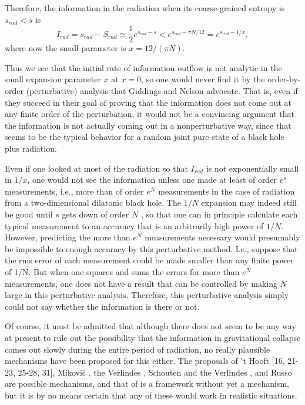 	Therefore, the information in the radiation when its
coarse-grained entropy
is $s_{rad} < s$ is
	\begin{equation}
	I_{rad}=s_{rad}-S_{rad} \simeq
\frac{1}{2}e^{s_{rad}-s}<e^{s_{rad}-\pi N/12}
	=e^{s_{rad}-1/x},
	\end{equation}
where now the small parameter is $x=12/(\pi N)$.

	Thus we see that the initial rate of information outflow is
not analytic in
the small expansion parameter $x$ at $x=0$, so one would never find
it by the
order-by-order (perturbative) analysis that Giddings and Nelson
advocate.
That is, even if they succeed in their goal of proving that the
information
does not
come out at any finite order of the perturbation, it would not be a
convincing
argument that the information is not actually coming out in a
nonperturbative
way, since that seems to be the typical behavior for a random joint
pure state
of a black hole plus radiation.

	Even if one looked at most of the radiation so that $I_{rad}$
is not
exponentially small in $1/x$, one would not see the information
unless one
made at least of order $e^s$ measurements, i.e., more than of order
$e^N$
measurements in the case of radiation from a two-dimensional
dilatonic black
hole.  The $1/N$ expansion may indeed still be good until $s$ gets
down
of order $N$ \cite{Gidpri}, so that one can in principle calculate
each
typical
measurement to an accuracy that is an arbitrarily high power of
$1/N$.
However, predicting the more than $e^N$ measurements necessary would
presumably be impossible to enough accuracy by this perturbative
method.
I.e., suppose that the rms error of each measurement could be made
smaller than any finite power of 1/N.  But when one squares and sums
the errors for more than $e^N$ measurements, one does not have
a result that can be controlled by making $N$ large in this
perturbative
analysis.  Therefore, this perturbative analysis simply could not say
whether the information is there or not.

	Of course, it must be admitted that although there does not
seem to be
any way at present to rule out the possibility that the information
in
gravitational
collapse comes out slowly during the entire period of radiation, no
really
plausible mechanisms have been proposed for this either.
The proposals of 't Hooft
[16, 21-23, 25-28, 31],
Mikovi\u{c} \cite{Mik,Mik93}, the Verlindes \cite{Ver93}, Schouten
and the
Verlindes \cite{Sch93}, and Russo \cite{Rus93} are possible
mechanisms,
and that of \cite{STU,Sus,SusT} is a framework without yet a
mechanism,
but it is by no means certain that any of these would work in
realistic
situations.

